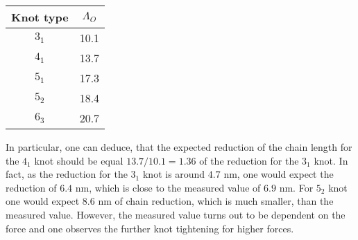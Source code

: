 \begin{table}
    \begin{tabular}{c|c}
        \textbf{Knot type} & $\Lambda_O$ \\\hline
        $3_1$ & 10.1 \\
        $4_1$ & 13.7 \\
        $5_1$ & 17.3 \\
        $5_2$ & 18.4 \\
        $6_3$ & 20.7 \\\hline
    \end{tabular}
    \label{tab:theory-knotted2}
\end{table}

In particular, one can deduce, that the expected reduction of the chain length for the $4_1$ knot should be equal $13.7/10.1=1.36$ of the reduction for the $3_1$ knot.
In fact, as the reduction for the $3_1$ knot is around $4.7$ nm, one would expect the reduction of $6.4$ nm, which is close to the measured value of $6.9$ nm.
For $5_2$ knot one would expect $8.6$ nm of chain reduction, which is much smaller, than the measured value.
However, the measured value turns out to be dependent on the force and one observes the further knot tightening for higher forces\cite{ziegler2016knotting}.

